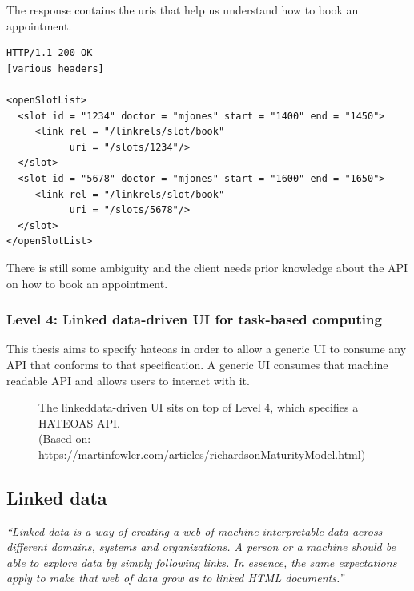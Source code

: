The response contains the \gls{uri}s that help us understand how to book an appointment.

\lstset{language=XML}
\begin{lstlisting}[caption=Level 3: The response contains information that helps us book an appointment.]
HTTP/1.1 200 OK
[various headers]

<openSlotList>
  <slot id = "1234" doctor = "mjones" start = "1400" end = "1450">
     <link rel = "/linkrels/slot/book"
           uri = "/slots/1234"/>
  </slot>
  <slot id = "5678" doctor = "mjones" start = "1600" end = "1650">
     <link rel = "/linkrels/slot/book"
           uri = "/slots/5678"/>
  </slot>
</openSlotList>
\end{lstlisting}

There is still some ambiguity and the client needs prior knowledge about the API on how to book an appointment.

\subsubsection{Level 4: Linked data-driven UI for task-based computing}
This thesis aims to specify \gls{hateoas} in order to allow a generic UI to consume any API that conforms to that specification. A generic UI consumes that machine readable API and allows users to interact with it.

\begin{figure}[!htb]
  \caption{The \gls{linkeddata}-driven UI sits on top of Level 4, which specifies a HATEOAS API. \\ (Based on: https://martinfowler.com/articles/richardsonMaturityModel.html)}
\end{figure}

\subsection{Linked data}\label{linkeddata}
\textit{``Linked data is a way of creating a web of machine interpretable data across different domains, systems and organizations. A person or a machine should be able to explore data by simply following links. In essence, the same expectations apply to make that web of data grow as to linked HTML documents.''} \citep{linkedatafourrules}

